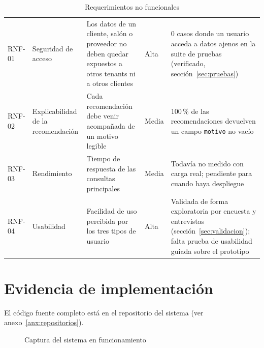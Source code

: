 \begin{table}[H]
    \centering
    \caption{Requerimientos no funcionales}
    \label{tab:rnf}
    \small
    \begin{tabularx}{\textwidth}{l L L l L}
        \toprule
         &  &  &  &  \\
        \midrule
        RNF-01 & Seguridad de acceso & Los datos de un cliente, salón o proveedor no deben quedar expuestos a otros tenants ni a otros clientes & Alta & 0 casos donde un usuario acceda a datos ajenos en la suite de pruebas (verificado, sección~\ref{sec:pruebas}) \\
        RNF-02 & Explicabilidad de la recomendación & Cada recomendación debe venir acompañada de un motivo legible & Media & 100\,\% de las recomendaciones devuelven un campo \texttt{motivo} no vacío \\
        RNF-03 & Rendimiento & Tiempo de respuesta de las consultas principales & Media & Todavía no medido con carga real; pendiente para cuando haya despliegue \\
        RNF-04 & Usabilidad & Facilidad de uso percibida por los tres tipos de usuario & Alta & Validada de forma exploratoria por encuesta y entrevistas (sección~\ref{sec:validacion}); falta prueba de usabilidad guiada sobre el prototipo \\
        \bottomrule
    \end{tabularx}
\end{table}

\section{Evidencia de implementación}

El código fuente completo está en el repositorio del sistema (ver
anexo~\ref{anx:repositorios}). 

\begin{figure}[H]
    \centering
    \caption{Captura del sistema en funcionamiento}
    \label{fig:captura}
\end{figure}

